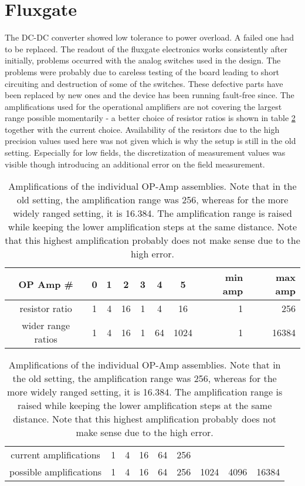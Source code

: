     \section{Fluxgate}
        The DC-DC converter showed low tolerance to power overload. A failed one had to be replaced.
        The readout of the fluxgate electronics works consistently after initially, problems occurred with the analog switches used in the design. The problems were probably due to careless testing of the board leading to short circuiting and destruction of some of the switches. These defective parts have been replaced by new ones and the device has been running fault-free since.
        The amplifications used for the operational amplifiers are not covering the largest range possible momentarily - a better choice of resistor ratios is shown in table \ref{table:discussion:amplifications} together with the current choice. Availability of the resistors due to the high precision values used here was not given which is why the setup is still in the old setting. Especially for low fields, the discretization of measurement values was visible though introducing an additional error on the field measurement.
        \begin{table}
            \label{table:discussion:amplifications}
            \centering
            \begin{tabular}{|c|ccc|ccc||rr|}
                \hline
                OP Amp \# & 0 & 1 & 2 & 3 & 4 & 5 & min amp& max amp\\
                \hline
                resistor ratio & 1 & 4 & 16 & 1 & 4 & 16 & 1 & 256\\
                wider range ratios & 1 & 4 & 16 & 1 & 64 & 1024& 1 & 16384\\
                \hline
            \end{tabular}
            \begin{tabular}{|c|cccccccc|}
                \hline
                current amplifications & 1 & 4 & 16 & 64 & 256 & & & \\
                possible amplifications & 1 & 4 & 16 & 64 & 256 & 1024 & 4096 & 16384\\
                \hline
            \end{tabular}
            \caption{Amplifications of the individual OP-Amp assemblies. Note that in the old setting, the amplification range was 256, whereas for the more widely ranged setting, it is 16.384. The amplification range is raised while keeping the lower amplification steps at the same distance. Note that this highest amplification probably does not make sense due to the high error.}
        \end{table}
